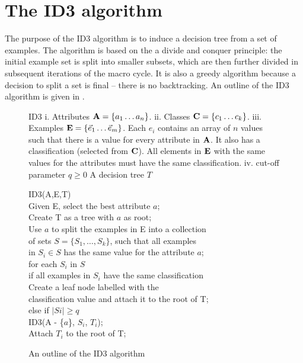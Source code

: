 
\section{The ID3 algorithm}
\label{sec:id3}
The purpose of the ID3 algorithm \cite{quinlan:trees} is to induce a decision tree from a set of examples.  The algorithm is based on the a divide and conquer principle: the initial example set is split into smaller subsets, which are then further divided in subsequent iterations of the macro cycle. It is also a greedy algorithm because a decision to split a set is final -- there is no backtracking.  An outline of the ID3 algorithm is given in .
\begin{figure}[!ht]
\begin{algorithm}
{ID3}
{ i. Attributes ${\bf A} = \{ a_1 \ldots a_n\}$. \newline
	ii. Classes ${\bf C} = \{ c_1 \ldots c_k\}$. \newline
  iii. Examples ${\bf E} = \{\vec e_1 \ldots \vec e_m\}$. Each $e_i$ contains an array of $n$ values such that there is a value for every attribute in ${\bf A}$.  It also has a classification (selected from ${\bf C}$). All elements in ${\bf E}$ with the same values for the attributes must have the same classification.\newline
	iv.  cut-off parameter $q \geq 0$
	}
{A decision tree $T$} 

ID3(A,E,T) \+\\
Given E, select the best attribute $a$; \label{line:id3_select} \\
Create T as a tree with $a$ as root; \\
Use $a$ to split the examples in E  into a collection  \+ \\
	of sets $S = \{S_1, \ldots, S_k\}$, such that all examples \\
	 in $S_i \in S$ has the same value for the attribute $a$; \- \\ 
for each $S_i$ in $S$ \+ \\
	if all examples in $S_i$ have the same classification \+ \\
			Create a leaf node labelled with the  \+ \\ 
			classification value and attach it
			to the root of T; \- \-\\ 
	else  if $|Si| \geq q$ \label{line:id3_prune}\+ \\ 
			ID3(A - \{$a$\}, $S_i$, $T_i$); \\
			Attach $T_i$ to the root of T;
\end{algorithm}
\caption{An outline of the ID3 algorithm}
\label{alg:id3}	
\end{figure}

